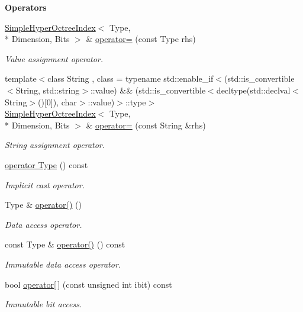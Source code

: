 \begin{Indent}{\bf Operators}\par
\begin{DoxyCompactItemize}
\item 
\hyperlink{exceptionmagrathea_1_1SimpleHyperOctreeIndex}{Simple\-Hyper\-Octree\-Index}$<$ Type, \\*
Dimension, Bits $>$ \& \hyperlink{exceptionmagrathea_1_1SimpleHyperOctreeIndex_a09ede8d9348e4eb8d307738ea5c99a3a}{operator=} (const Type rhs)
\begin{DoxyCompactList}\small\item\em Value assignment operator. \end{DoxyCompactList}\item 
{\footnotesize template$<$class String , class  = typename std\-::enable\-\_\-if$<$(std\-::is\-\_\-convertible$<$\-String, std\-::string$>$\-::value) \&\& (std\-::is\-\_\-convertible$<$decltype(std\-::declval$<$\-String$>$()\mbox{[}0\mbox{]}), char$>$\-::value)$>$\-::type$>$ }\\\hyperlink{exceptionmagrathea_1_1SimpleHyperOctreeIndex}{Simple\-Hyper\-Octree\-Index}$<$ Type, \\*
Dimension, Bits $>$ \& \hyperlink{exceptionmagrathea_1_1SimpleHyperOctreeIndex_af5fb86d71abfbb2b6beb8323a09bb22a}{operator=} (const String \&rhs)
\begin{DoxyCompactList}\small\item\em String assignment operator. \end{DoxyCompactList}\item 
\hyperlink{exceptionmagrathea_1_1SimpleHyperOctreeIndex_a4d04bfe698ca32ccbc6f1ed1755852cc}{operator Type} () const 
\begin{DoxyCompactList}\small\item\em Implicit cast operator. \end{DoxyCompactList}\item 
Type \& \hyperlink{exceptionmagrathea_1_1SimpleHyperOctreeIndex_a4a18dbc6422e5a3e009fcd50f05459eb}{operator()} ()
\begin{DoxyCompactList}\small\item\em Data access operator. \end{DoxyCompactList}\item 
const Type \& \hyperlink{exceptionmagrathea_1_1SimpleHyperOctreeIndex_a97119d726b0e344ace1f6b1b28c32f2b}{operator()} () const 
\begin{DoxyCompactList}\small\item\em Immutable data access operator. \end{DoxyCompactList}\item 
bool \hyperlink{exceptionmagrathea_1_1SimpleHyperOctreeIndex_adddbd10f4b988c54fb495b28e434874d}{operator\mbox{[}$\,$\mbox{]}} (const unsigned int ibit) const 
\begin{DoxyCompactList}\small\item\em Immutable bit access. \end{DoxyCompactList}\end{DoxyCompactItemize}
\end{Indent}
